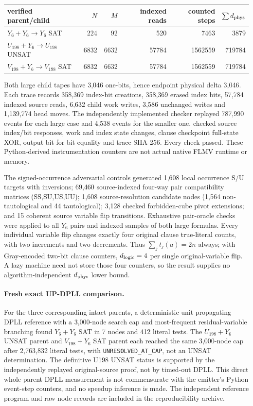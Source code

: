 \documentclass[11pt]{article}
\begin{document}
\begin{center}\begin{tabular}{lrrrrr}\toprule
verified parent/child & $N$ & $M$ & indexed reads & counted steps & $\sum d_{\rm phys}$\\\midrule
$Y_6+Y_6\to Y_6$ SAT &224&92&520&7463&3879\\
$U_{198}+Y_6\to U_{198}$ UNSAT&6832&6632&57784&1562559&719784\\
$V_{198}+Y_6\to V_{198}$ SAT&6832&6632&57784&1562559&719784\\\bottomrule
\end{tabular}\end{center}
Both large child tapes have 3,046 one-bits, hence endpoint physical delta 3,046. Each trace records 358,369 index-bit creations, 358,369 erased index bits, 57,784 indexed source reads, 6,632 child work writes, 3,586 unchanged writes and 1,139,774 head moves. The independently implemented checker replayed 787,990 events for each large case and 4,538 events for the smaller one, checked source index/bit responses, work and index state changes, clause checkpoint full-state XOR, output bit-for-bit equality and trace SHA-256. Every check passed. These Python-derived instrumentation counters are not actual native FLMV runtime or memory.

The signed-occurrence adversarial controls generated 1,608 local occurrence S/U targets with inversions; 69,460 source-indexed four-way pair compatibility matrices (SS,SU,US,UU); 1,608 source-resolution candidate nodes (1,564 non-tautological and 44 tautological); 3,128 checked forbidden-cube pivot extensions; and 15 coherent source variable flip transitions. Exhaustive pair-oracle checks were applied to all $Y_6$ pairs and indexed samples of both large formulas. Every individual variable flip changes exactly four original clause true-literal counts, with two increments and two decrements. Thus $\sum_j t_j(a)=2n$ always; with Gray-encoded two-bit clause counters, $d_{\rm logic}=4$ per single original-variable flip. A lazy machine need not store those four counters, so the result supplies no algorithm-independent $d_{\rm phys}$ lower bound.

\paragraph{Fresh exact UP-DPLL comparison.}
For the three corresponding intact parents, a deterministic unit-propagating DPLL reference with a 3,000-node search cap and most-frequent residual-variable branching found $Y_6+Y_6$ SAT in 7 nodes and 412 literal tests. The $U_{198}+Y_6$ UNSAT parent and $V_{198}+Y_6$ SAT parent each reached the same 3,000-node cap after 2,763,832 literal tests, with \texttt{UNRESOLVED\_AT\_CAP}, not an UNSAT determination. The definitive U198 UNSAT status is supported by the independently replayed original-source proof, not by timed-out DPLL. This direct whole-parent DPLL measurement is not commensurate with the emitter's Python event-step counters, and no speedup inference is made. The independent reference program and raw node records are included in the reproducibility archive.
\end{document}
